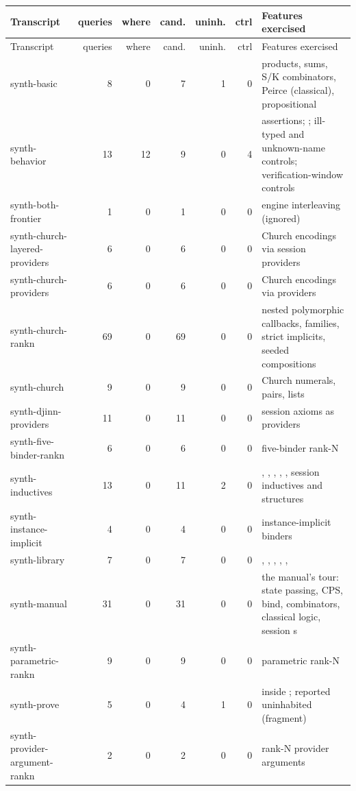 {\small
\begin{longtable}{@{}L{4.3cm}rrrrrL{4.85cm}@{}}
\toprule
Transcript & queries & where & cand. & uninh. & ctrl & Features exercised \\
\midrule
\endfirsthead
\toprule
Transcript & queries & where & cand. & uninh. & ctrl & Features exercised \\
\midrule
\endhead
synth-basic & 8 & 0 & 7 & 1 & 0 & products, sums, S/K combinators, Peirce (classical), propositional \\
synth-behavior & 13 & 12 & 9 & 0 & 4 & assertions; ; ill-typed and unknown-name controls; verification-window controls \\
synth-both-frontier & 1 & 0 & 1 & 0 & 0 & engine interleaving (ignored) \\
synth-church-layered-providers & 6 & 0 & 6 & 0 & 0 & Church encodings via session providers \\
synth-church-providers & 6 & 0 & 6 & 0 & 0 & Church encodings via providers \\
synth-church-rankn & 69 & 0 & 69 & 0 & 0 & nested polymorphic callbacks,  families, strict implicits, seeded compositions \\
synth-church & 9 & 0 & 9 & 0 & 0 & Church numerals, pairs, lists \\
synth-djinn-providers & 11 & 0 & 11 & 0 & 0 & session axioms as providers \\
synth-five-binder-rankn & 6 & 0 & 6 & 0 & 0 & five-binder rank-N \\
synth-inductives & 13 & 0 & 11 & 2 & 0 & , , , , , session inductives and structures \\
synth-instance-implicit & 4 & 0 & 4 & 0 & 0 & instance-implicit binders \\
synth-library & 7 & 0 & 7 & 0 & 0 & , , , , ,  \\
synth-manual & 31 & 0 & 31 & 0 & 0 & the manual's tour: state passing, CPS,  bind,  combinators, classical logic, session s \\
synth-parametric-rankn & 9 & 0 & 9 & 0 & 0 & parametric rank-N \\
synth-prove & 5 & 0 & 4 & 1 & 0 &  inside ;  reported uninhabited (fragment) \\
synth-provider-argument-rankn & 2 & 0 & 2 & 0 & 0 & rank-N provider arguments \\

\end{longtable}}
